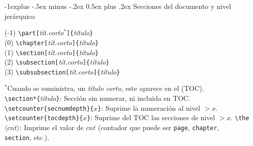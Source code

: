 \documentclass[10pt,landscape,a4paper]{article}
\makeatletter
\renewcommand{\section}{\@startsection{section}{1}{0mm}%
                                {-1ex plus -.5ex minus -.2ex}%
                                {0.5ex plus .2ex}%
                                {\normalfont\large\bfseries}}
\renewcommand{\subsection}{\@startsection{subsection}{2}{0mm}%
                                {-1explus -.5ex minus -.2ex}%
                                {0.5ex plus .2ex}%
                                {\normalfont\normalsize\bfseries}}
\renewcommand{\subsubsection}{\@startsection{subsubsection}{3}{0mm}%
                                {-1ex plus -.5ex minus -.2ex}%
                                {1ex plus .2ex}%
                                {\normalfont\small\bfseries}}
\makeatother
\begin{document}
\begin{multicols}{3}
\subsection{Secciones del documento y nivel jerárquico}
\begin{multicols}{2}
(-1) \verb!\part[!\emph{tít.corto$^*$}\verb!]{!\emph{título}\verb!}!  \\
(0) \verb!\chapter[!\emph{tít.corto}\verb!]{!\emph{título}\verb!}!  \\
(1) \verb!\section[!\emph{tít.corto}\verb!]{!\emph{título}\verb!}!  \\
(2) \verb!\subsection[!\emph{tít.corto}\verb!]{!\emph{título}\verb!}!  \\
(3) \verb!\subsubsection[!\emph{tít.corto}\verb!]{!\emph{título}\verb!}!  \\
\end{multicols}


$^*$Cuando se suministra, un \emph{título corto}, este aparece en el (TOC). \\[0.7mm]
\verb!\section*{!\emph{título}\verb!}!: Sección sin numerar, ni incluida en TOC.\\
\verb!\setcounter{secnumdepth}{!$x$\verb!}!: Suprime la numeración al nivel $>x$.
\verb!\setcounter{tocdepth}{!$x$\verb!}!: Suprime del TOC las secciones de nivel $>x$.
\verb!\the!$\langle cnt \rangle$: Imprime el valor de $cnt$ (contador que puede ser \texttt{page}, \texttt{chapter},\\
\phantom{the+cnt+++}\texttt{section}, etc.).







\end{multicols}
\end{document}

